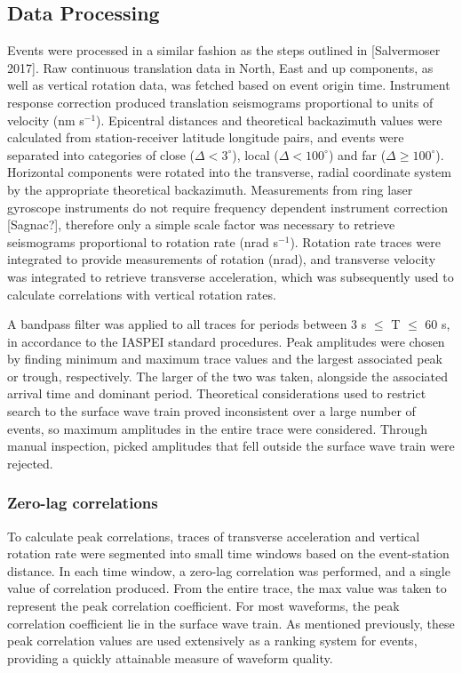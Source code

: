 \documentclass{gji}
\begin{document}
\subsection{Data Processing}\label{sec:dataproc}
Events were processed in a similar fashion as the steps outlined in [Salvermoser 2017]. %
Raw continuous translation data in North, East and up components, as well as vertical rotation data, was fetched based on event origin time. Instrument response correction produced translation seismograms proportional to units of velocity (nm s$^{-1}$). Epicentral distances and theoretical backazimuth values were calculated from station-receiver latitude longitude pairs, and events were separated into categories of close ($\Delta < 3^\circ$), local ($\Delta <100^\circ$) and far ($\Delta \ge 100^\circ$). Horizontal components were rotated into the transverse, radial coordinate system by the appropriate theoretical backazimuth. Measurements from ring laser gyroscope instruments do not require frequency dependent instrument correction [Sagnac?], %
therefore only a simple scale factor was necessary to retrieve seismograms proportional to rotation rate (nrad s$^{-1}$). Rotation rate traces were integrated to provide measurements of rotation (nrad), and transverse velocity was integrated to retrieve transverse acceleration, which was subsequently used to calculate correlations with vertical rotation rates.

A bandpass filter was applied to all traces for periods between 3 s $\le$ T $\le$ 60 s, in accordance to the IASPEI standard procedures. Peak amplitudes were chosen by finding minimum and maximum trace values and the largest associated peak or trough, respectively. The larger of the two was taken, alongside the associated arrival time and dominant period. %
Theoretical considerations used to restrict search to the surface wave train proved inconsistent over a large number of events, so maximum amplitudes in the entire trace were considered. Through manual inspection, picked amplitudes that fell outside the surface wave train were rejected. %

\subsubsection{Zero-lag correlations}
To calculate peak correlations, traces of transverse acceleration and vertical rotation rate were segmented into small time windows based on the event-station distance. In each time window, a zero-lag correlation was performed, and a single value of correlation produced. From the entire trace, the max value was taken to represent the peak correlation coefficient. For most waveforms, the peak correlation coefficient lie in the surface wave train. As mentioned previously, these peak correlation values are used extensively as a ranking system for events, providing a quickly attainable measure of waveform quality.
\end{document}
